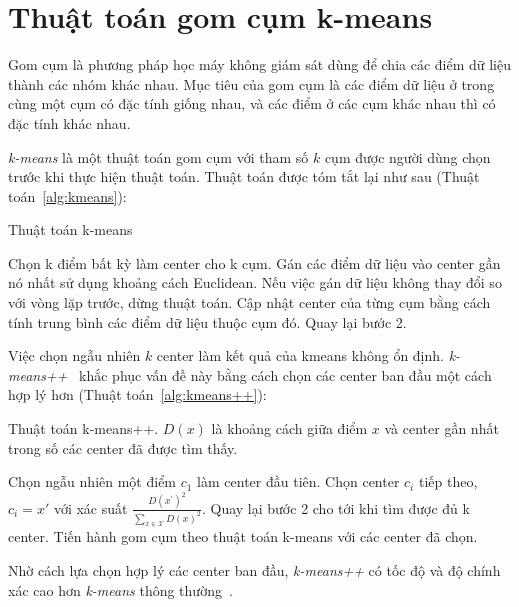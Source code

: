 \section{Thuật toán gom cụm k-means}
Gom cụm là phương pháp học máy không giám sát dùng để chia các điểm dữ liệu thành các nhóm khác nhau. Mục tiêu của gom cụm là các điểm dữ liệu ở trong cùng một cụm có đặc tính giống nhau, và các điểm ở các cụm khác nhau thì có đặc tính khác nhau.

\textit{k-means} là một thuật toán gom cụm với tham số $k$ cụm được người dùng chọn trước khi thực hiện thuật toán. Thuật toán được tóm tắt lại như sau (Thuật toán~\ref{alg:kmeans}):
\begin{algorithm}
    \caption{Thuật toán k-means}\label{alg:kmeans}
    \begin{algorithmic}[1]
\State Chọn k điểm bất kỳ làm center cho k cụm.
\State Gán các điểm dữ liệu vào center gần nó nhất sử dụng khoảng cách Euclidean.
\State Nếu việc gán dữ liệu không thay đổi so với vòng lặp trước, dừng thuật toán.
\State Cập nhật center của từng cụm bằng cách tính trung bình các điểm dữ liệu thuộc cụm đó.
\State Quay lại bước 2.
    \end{algorithmic}
\end{algorithm}

Việc chọn ngẫu nhiên $k$ center làm kết quả của kmeans không ổn định. \textit{k-means++}~\cite{arthurKmeansAdvantagesCareful2007} khắc phục vấn đề này bằng cách chọn các center ban đầu một cách hợp lý hơn (Thuật toán~\ref{alg:kmeans++}):
\begin{algorithm}
    \caption{Thuật toán k-means++. $D(x)$ là khoảng cách giữa điểm $x$ và center gần nhất trong số các center đã được tìm thấy.}\label{alg:kmeans++}
    \begin{algorithmic}[1]
    \State Chọn ngẫu nhiên một điểm $c_1$ làm center đầu tiên.
    \State Chọn center $c_i$ tiếp theo, $c_i = x'$ với xác suất \(\frac{D\left(x^{\prime}\right)^{2}}{\sum_{x \in \mathcal{X}} D(x)^{2}}\).
    \State Quay lại bước 2 cho tới khi tìm được đủ k center.
    \State Tiến hành gom cụm theo thuật toán k-means với các center đã chọn.
    \end{algorithmic}
\end{algorithm}

Nhờ cách lựa chọn hợp lý các center ban đầu, \textit{k-means++} có tốc độ và độ chính xác cao hơn \textit{k-means} thông thường~\cite{arthurKmeansAdvantagesCareful2007}.

